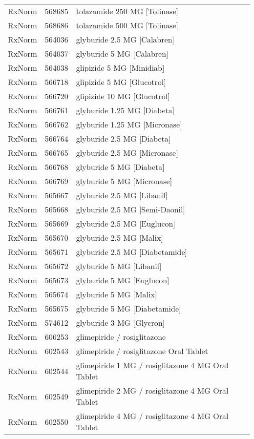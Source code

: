 \begin{longtable}{p{}p{}p{}}
  RxNorm & 568685 & tolazamide 250 MG [Tolinase] \\ 
  RxNorm & 568686 & tolazamide 500 MG [Tolinase] \\ 
  RxNorm & 564036 & glyburide 2.5 MG [Calabren] \\ 
  RxNorm & 564037 & glyburide 5 MG [Calabren] \\ 
  RxNorm & 564038 & glipizide 5 MG [Minidiab] \\ 
  RxNorm & 566718 & glipizide 5 MG [Glucotrol] \\ 
  RxNorm & 566720 & glipizide 10 MG [Glucotrol] \\ 
  RxNorm & 566761 & glyburide 1.25 MG [Diabeta] \\ 
  RxNorm & 566762 & glyburide 1.25 MG [Micronase] \\ 
  RxNorm & 566764 & glyburide 2.5 MG [Diabeta] \\ 
  RxNorm & 566765 & glyburide 2.5 MG [Micronase] \\ 
  RxNorm & 566768 & glyburide 5 MG [Diabeta] \\ 
  RxNorm & 566769 & glyburide 5 MG [Micronase] \\ 
  RxNorm & 565667 & glyburide 2.5 MG [Libanil] \\ 
  RxNorm & 565668 & glyburide 2.5 MG [Semi-Daonil] \\ 
  RxNorm & 565669 & glyburide 2.5 MG [Euglucon] \\ 
  RxNorm & 565670 & glyburide 2.5 MG [Malix] \\ 
  RxNorm & 565671 & glyburide 2.5 MG [Diabetamide] \\ 
  RxNorm & 565672 & glyburide 5 MG [Libanil] \\ 
  RxNorm & 565673 & glyburide 5 MG [Euglucon] \\ 
  RxNorm & 565674 & glyburide 5 MG [Malix] \\ 
  RxNorm & 565675 & glyburide 5 MG [Diabetamide] \\ 
  RxNorm & 574612 & glyburide 3 MG [Glycron] \\ 
  RxNorm & 606253 & glimepiride / rosiglitazone \\ 
  RxNorm & 602543 & glimepiride / rosiglitazone Oral Tablet \\ 
  RxNorm & 602544 & glimepiride 1 MG / rosiglitazone 4 MG Oral Tablet \\ 
  RxNorm & 602549 & glimepiride 2 MG / rosiglitazone 4 MG Oral Tablet \\ 
  RxNorm & 602550 & glimepiride 4 MG / rosiglitazone 4 MG Oral Tablet \\ 

\end{longtable}
